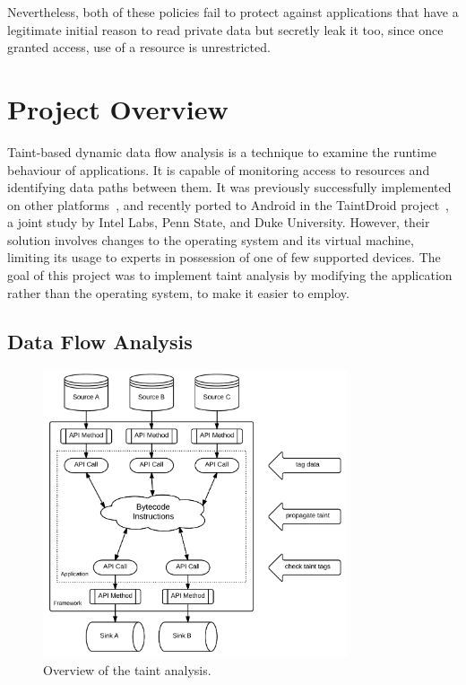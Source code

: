 \documentclass[12pt,twoside,notitlepage]{report}
\begin{document}
Nevertheless, both of these policies fail to protect against applications that have a legitimate initial reason to read private data but secretly leak it too, since once granted access, use of a resource is unrestricted.

\section{Project Overview}

Taint-based dynamic data flow analysis is a technique to examine the runtime behaviour of applications. It is capable of monitoring access to resources and identifying data paths between them. It was previously successfully implemented on other platforms~\cite{Zhu:2011:TPS:1945023.1945039}, and recently ported to Android in the TaintDroid project~\cite{web:TaintDroid, Enck:2010:TIT:1924943.1924971}, a joint study by Intel Labs, Penn State, and Duke University. However, their solution involves changes to the operating system and its virtual machine, limiting its usage to experts in possession of one of few supported devices. The goal of this project was to implement taint analysis by modifying the application rather than the operating system, to make it easier to employ.

\subsection{Data Flow Analysis}

\begin{figure}
	\centerline{	
		\includegraphics[width=0.8\textwidth]{figs/fig_intro_tainting.png}
	}
	\caption{Overview of the taint analysis.}
	\label{fig:Introduction_TaintingOverview}
\end{figure}
\end{document}
